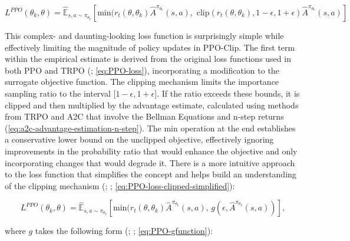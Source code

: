             \begin{equation}
                L^{PPO}(\theta_k, \theta) = \mathbb{\hat{E}}_{s, a \sim \pi_{\theta_k}} \left [ \text{min}(r_t(\theta, \theta_k) \hat{A}^{\pi_{\theta_k}}(s, a),\text{ clip}(r_t(\theta, \theta_k), 1-\epsilon, 1+\epsilon)\hat{A}^{\pi_{\theta_k}}(s, a)\right]
                \label{eq:PPO-loss-clipped}
            \end{equation}
            
            
            \noindent This complex- and daunting-looking loss function is surprisingly simple while effectively limiting the magnitude of policy updates in PPO-Clip. The first term within the empirical estimate is derived from the original loss functions used in both PPO and TRPO (\textcolor{deepblue}{\cite{schulman2017proximal}; \autoref{eq:PPO-loss}}), incorporating a modification to the surrogate objective function. The clipping mechanism limits the importance sampling ratio to the interval [$1-\epsilon, 1+\epsilon$]. If the ratio exceeds these bounds, it is clipped and then multiplied by the advantage estimate, calculated using methods from TRPO and A2C that involve the Bellman Equations and n-step returns (\textcolor{deepblue}{\autoref{eq:a2c-advantage-estimation-n-step}}). The min operation at the end establishes a conservative lower bound on the unclipped objective, effectively ignoring improvements in the probability ratio that would enhance the objective and only incorporating changes that would degrade it. There is a more intuitive approach to the loss function that simplifies the concept and helps build an understanding of the clipping mechanism (\textcolor{deepblue}{\cite{SpinningUp2018}; \cite{schulman2017proximal}; \autoref{eq:PPO-loss-clipped-simplified}}):
            
            \begin{equation}
                L^{PPO}(\theta_k, \theta) = \mathbb{\hat{E}}_{s, a \sim \pi_{\theta_k}} \left [ \text{min}(r_t(\theta, \theta_k) \hat{A}^{\pi_{\theta_k}}(s, a)\text{, }g(\epsilon, \hat{A}^{\pi_{\theta_k}}(s, a))\right],
                \label{eq:PPO-loss-clipped-simplified}
            \end{equation}
            
            \noindent where $g$ takes the following form (\textcolor{deepblue}{\cite{SpinningUp2018}; \cite{schulman2017proximal}; \autoref{eq:PPO-gfunction}}):
            
